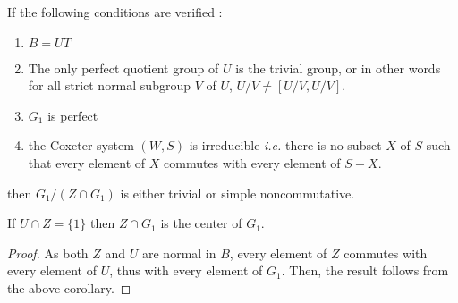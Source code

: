 \begin{theoreme} \label{thm:simple}
If the following conditions are verified :
\begin{enumerate}
    \item \label{simple1} $B = UT$
    \item \label{simple2} The only perfect quotient group of $U$ is the trivial  group, or in other words for all strict normal subgroup $V$ of $U$,  $U / V \neq  [ U / V, U/V]$.
    \item \label{simple3}$G_1$ is perfect
    \item \label{simple4} the Coxeter system $\left( W,S \right)$ is irreducible \textit{i.e.} there is no subset $X$ of $S$ such that every element of $X$ commutes with every element of $S-X$.
\end{enumerate} 
    then $G_1 / \left( Z \cap G_1 \right)$ is either trivial or simple noncommutative.
\end{theoreme}

\begin{corollary} \label{cor:2}
    If $U \cap Z = \{1\}$ then $Z \cap G_1$ is the center of $G_1$.
\end{corollary}

\begin{proof}
    As both $Z$ and $U$ are normal in $B$, every element of $Z$ commutes with every element of $U$, thus with every element of $G_1$. Then, the result follows from the above corollary.
\end{proof}

